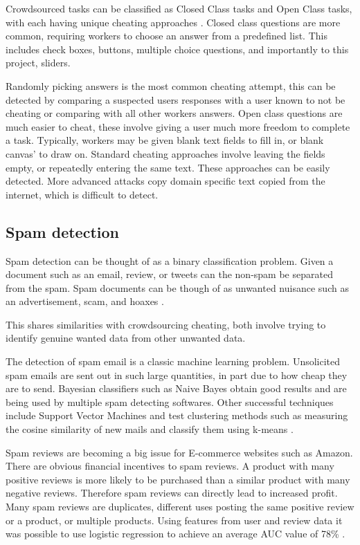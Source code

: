 \documentclass{article}
\begin{document}
Crowdsourced tasks can be classified as Closed Class tasks and Open Class tasks, with each having unique cheating approaches \cite{eickhoff2013increasing}.
Closed class questions are more common, requiring workers to choose an answer from a predefined list.
This includes check boxes, buttons, multiple choice questions, and importantly to this project, sliders.

Randomly picking answers is the most common cheating attempt, this can be detected by comparing a suspected users responses with a user known to not be cheating or comparing with all other workers answers.
Open class questions are much easier to cheat, these involve giving a user much more freedom to complete a task.
Typically, workers may be given blank text fields to fill in, or blank canvas' to draw on.
Standard cheating approaches involve leaving the fields empty, or repeatedly entering the same text.
These approaches can be easily detected.
More advanced attacks copy domain specific text copied from the internet, which is difficult to detect. 

\subsection{Spam detection}

Spam detection can be thought of as a binary classification problem.
Given a document such as an email, review, or tweets can the non-spam be separated from the spam.
Spam documents can be though of as unwanted nuisance such as an advertisement, scam, and hoaxes \cite{sasaki2005spam}.
 
This shares similarities with crowdsourcing cheating, both involve trying to identify genuine wanted data from other unwanted data.

The detection of spam email is a classic machine learning problem.
Unsolicited spam emails are sent out in such large quantities, in part due to how cheap they are to send.
Bayesian classifiers such as Naive Bayes obtain good results and are being used by multiple spam detecting softwares.
Other successful techniques include Support Vector Machines and test clustering methods such as measuring the cosine similarity of new mails and classify them using k-means \cite{sasaki2005spam}.

Spam reviews are becoming a big issue for E-commerce websites such as Amazon.
There are obvious financial incentives to spam reviews.
A product with many positive reviews is more likely to be purchased than a similar product with many negative reviews.
Therefore spam reviews can directly lead to increased profit.
Many spam reviews are duplicates, different uses posting the same positive review or a product, or multiple products.
Using features from user and review data it was possible to use logistic regression to achieve an average AUC value of 78\% \cite{jindal2007review}.
\end{document}
